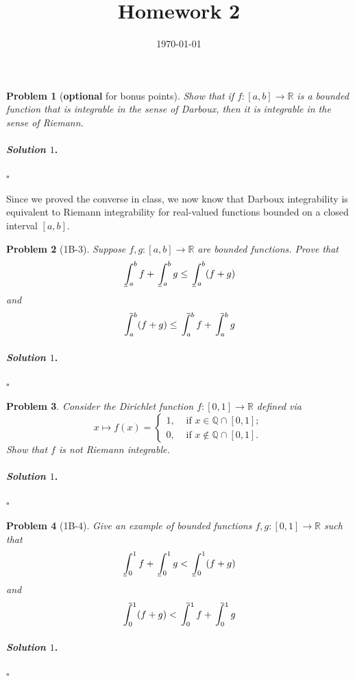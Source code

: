 \documentclass[reqno]{amsart}
\def\upint{\mathchoice%
    {\mkern13mu\overline{\vphantom{\intop}\mkern7mu}\mkern-20mu}%
    {\mkern7mu\overline{\vphantom{\intop}\mkern7mu}\mkern-14mu}%
    {\mkern7mu\overline{\vphantom{\intop}\mkern7mu}\mkern-14mu}%
    {\mkern7mu\overline{\vphantom{\intop}\mkern7mu}\mkern-14mu}%
  \int}
\def\lowint{\mkern3mu\underline{\vphantom{\intop}\mkern7mu}\mkern-10mu\int}
\theoremstyle{plain}
\newtheorem{problem}{Problem}
\theoremstyle{definition}
\newenvironment{solution1}{\paragraph{\emph{Solution $1$}.}}{\hfill$\square$}
\begin{document}
 

\title[Homework 2]{Homework 2}

\date{\today} 
\maketitle 
 

\begin{problem}[{\bfseries optional} for bonus points]
Show that if $f:[a,b] \rightarrow \mathbb{R}$ is a bounded function that is integrable in the sense of Darboux, then it is integrable in the sense of Riemann.
\end{problem}
\begin{solution1}

\end{solution1}

Since we proved the converse in class, we now know that Darboux integrability is equivalent to Riemann integrability for real-valued functions bounded on a closed interval $[a,b]$.


\begin{problem}[1B-3]
Suppose $f,g:[a,b] \rightarrow \mathbb{R}$ are bounded functions.  Prove that
$$\lowint_{a}^{b}f + \lowint_{a}^{b}g \le \lowint_{a}^{b}(f+g) $$
and
$$\upint_{a}^{b}(f+g) \le \upint_{a}^{b}f + \upint_{a}^{b}g  $$
\end{problem}
\begin{solution1}

\end{solution1}

\begin{problem}
Consider the Dirichlet function $f:[0,1] \rightarrow \mathbb{R}$ defined via
$$x \mapsto f(x) = \begin{cases}1, &\text{ if } x \in \mathbb{Q}\cap [0,1];\\ 0, &\text{ if } x \notin \mathbb{Q}\cap[0,1].  \end{cases} $$
Show that $f$ is not Riemann integrable.
\end{problem}
\begin{solution1}

\end{solution1}


\begin{problem}[1B-4]
Give an example of bounded functions $f,g:[0,1] \rightarrow \mathbb{R}$ such that
$$\lowint_{0}^{1}f + \lowint_{0}^{1}g < \lowint_{0}^{1}(f+g) $$
and
$$\upint_{0}^{1}(f+g) < \upint_{0}^{1}f + \upint_{0}^{1}g  $$
\end{problem}
\begin{solution1}

\end{solution1}
\end{document}
